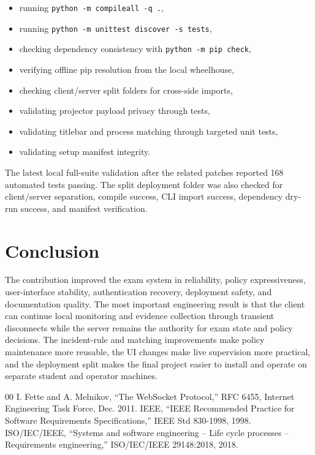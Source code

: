 \documentclass[conference]{IEEEtran}
\begin{document}
\begin{itemize}
    \item running \texttt{python -m compileall -q .},
    \item running \texttt{python -m unittest discover -s tests},
    \item checking dependency consistency with \texttt{python -m pip check},
    \item verifying offline pip resolution from the local wheelhouse,
    \item checking client/server split folders for cross-side imports,
    \item validating projector payload privacy through tests,
    \item validating titlebar and process matching through targeted unit tests,
    \item validating setup manifest integrity.
\end{itemize}

The latest local full-suite validation after the related patches reported 168 automated tests passing. The split deployment folder was also checked for client/server separation, compile success, CLI import success, dependency dry-run success, and manifest verification.

\section{Conclusion}

The contribution improved the exam system in reliability, policy expressiveness, user-interface stability, authentication recovery, deployment safety, and documentation quality. The most important engineering result is that the client can continue local monitoring and evidence collection through transient disconnects while the server remains the authority for exam state and policy decisions. The incident-rule and matching improvements make policy maintenance more reusable, the UI changes make live supervision more practical, and the deployment split makes the final project easier to install and operate on separate student and operator machines.

\begin{thebibliography}{00}
 I. Fette and A. Melnikov, ``The WebSocket Protocol,'' RFC 6455, Internet Engineering Task Force, Dec. 2011.
 IEEE, ``IEEE Recommended Practice for Software Requirements Specifications,'' IEEE Std 830-1998, 1998.
 ISO/IEC/IEEE, ``Systems and software engineering -- Life cycle processes -- Requirements engineering,'' ISO/IEC/IEEE 29148:2018, 2018.
\end{thebibliography}
\end{document}
